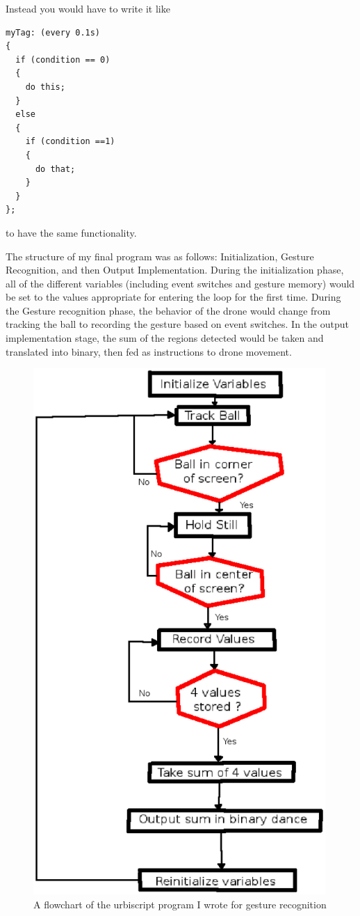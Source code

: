 \documentclass[a4paper,12pt]{report}
\begin{document}
Instead you would have to write it like
\begin{lstlisting}
myTag: (every 0.1s)
{
  if (condition == 0)
  {
    do this;
  }
  else
  {
    if (condition ==1)
    {
      do that;
    }
  }
};
\end{lstlisting}

to have the same functionality. 

The structure of my final program was as follows: Initialization, Gesture Recognition, and then Output Implementation. During the initialization phase, all of the different variables (including event switches and gesture memory) would be set to the values appropriate for entering the loop for the first time. During the Gesture recognition phase, the behavior of the drone would change from tracking the ball to recording the gesture based on event switches. In the output implementation stage, the sum of the regions detected would be taken and translated into binary, then fed as instructions to drone movement. 

\begin{figure}
 \includegraphics[height=200mm] {flowchart.eps}
\caption{A flowchart of the urbiscript program I wrote for gesture recognition }
\end{figure}
\end{document}
